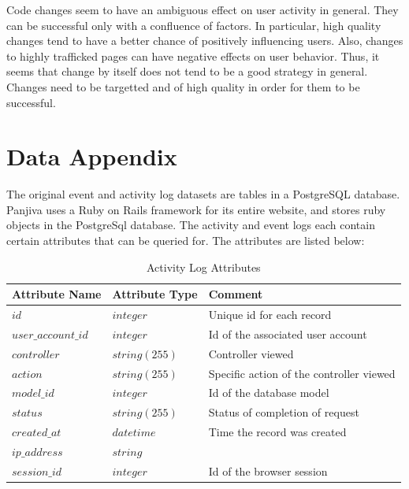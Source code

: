 \documentclass[12pt]{article}
\begin{document}
Code changes seem to have an ambiguous effect on user activity in general. They can be successful only with a confluence of factors. In particular, high quality changes tend to have a better chance of positively influencing users. Also, changes to highly trafficked pages can have negative effects on user behavior. Thus, it seems that change by itself does not tend to be a good strategy in general. Changes need to be targetted and of high quality in order for them to be successful. 

\appendix

\section{Data Appendix}

The original event and activity log datasets are tables in a PostgreSQL database. Panjiva uses a Ruby on Rails framework for its entire website, and stores ruby objects in the PostgreSql database. The activity and event logs each contain certain attributes that can be queried for. The attributes are listed below:

\begin{table}[h!]
\caption{Activity Log Attributes}
\begin{tabular}{l | l | l}
\centering
Attribute Name & Attribute Type & Comment\\
\hline \hline
$id                          $& $integer$  & Unique id for each record   \\ 
$user\_account\_id             $& $integer$  & Id of the associated user account   \\
$controller                  $& $string(255)$ & Controller viewed \\
$action                      $& $string(255)$ & Specific action of the controller viewed \\
$model\_id                    $& $integer$    & Id of the database model \\
$status                      $& $string(255)$ & Status of completion of request \\
$created\_at                  $& $datetime$   & Time the record was created \\ 
$ip\_address                  $& $string$     &  \\
$session\_id                  $& $integer$    & Id of the browser session \\
\end{tabular}
\end{table}
\end{document}
